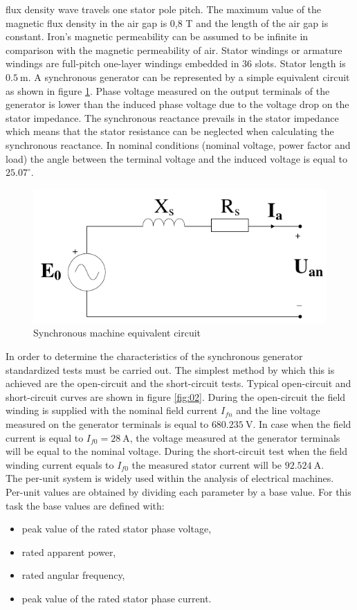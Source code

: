\documentclass[openany]{book}
\begin{document}
	flux density wave travels one stator pole pitch. The maximum value of the 
	magnetic flux density in the air gap is 0,8 T and the length of the air gap 
	is constant. Iron's magnetic permeability can be assumed to be infinite in 
	comparison with the magnetic permeability of air. 
	Stator windings or armature windings are full-pitch one-layer windings 
	embedded in 36 slots. Stator length is $0.5\ \mathrm{m}$. A synchronous 
	generator can be represented by a simple equivalent circuit as shown in 
	figure \ref{fig:01}. Phase voltage measured on the output terminals of the 
	generator is lower than the induced phase voltage due to the voltage drop 
	on the stator impedance. The synchronous reactance prevails in the stator 
	impedance which means that the stator resistance can be neglected when 
	calculating the synchronous reactance. In nominal conditions (nominal 
	voltage, power factor and load) the angle between the terminal voltage and 
	the induced voltage is equal to $25.07^{\circ}$.
	\begin{figure}[!htb]
		\centering
		\includegraphics{Images/EquivalentCircuit.pdf}
		\caption{Synchronous machine equivalent circuit}
		\label{fig:01}
	\end{figure}
	In order to determine the characteristics of the synchronous generator 
	standardized tests must be carried out. The simplest method by which this 
	is achieved are the open-circuit and the short-circuit tests. Typical 
	open-circuit and short-circuit curves are shown in figure \ref{fig:02}. 
	During the open-circuit the field winding is supplied with the nominal 
	field current $I_{fn}$ and the line voltage measured on the generator 
	terminals is equal to $680.235\ \mathrm{V}$. In case when the field current 
	is equal to $I_{f0} = 28 \ \mathrm{A}$, the voltage measured at the 
	generator terminals will be equal to the nominal voltage. During the 
	short-circuit test when the field winding current equals to $I_{f0}$ the 
	measured stator current will be $92.524\ \mathrm{A}$.
	\\The per-unit system is widely used within the analysis of electrical 
	machines. Per-unit values are obtained by dividing each parameter by a base 
	value. For this task the base values are defined with:
	\begin{itemize}
		\item peak value of the rated stator phase voltage,
		\item rated apparent power,
		\item rated angular frequency,
		\item peak value of the rated stator phase current.
	\end{itemize}
	
\end{document}
